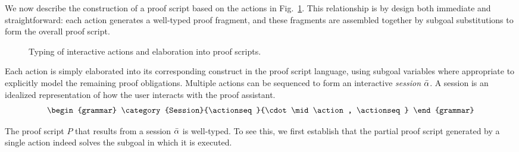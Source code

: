 We now describe the construction of a proof script based on the
actions in Fig.~\ref{fig:interactive}. This relationship is by
design both immediate and straightforward: each action generates a well-typed
proof fragment, and these fragments are assembled together by subgoal
substitutions to form the overall proof script.

\begin{figure}
  \caption{%
    Typing of interactive actions and elaboration into proof scripts.
  }%
  \label{fig:interactive}%
\end{figure}

Each action is simply elaborated into its corresponding construct in the proof
script language, using subgoal variables where appropriate to explicitly model
the remaining proof obligations.
%
%
%
%
%
Multiple actions can be sequenced to form an interactive
\emph{session} $\bar{\alpha}$. A session is an idealized representation of how the
user interacts with the proof assistant.
%
\[
  \begin{grammar}
    \category{Session}{\actionseq}{\cdot \mid \action, \actionseq}
  \end{grammar}
\]
%

The proof script $P$ that results from a session $\bar{\alpha}$ is well-typed.
To see this, we first establish that the partial proof script generated by a
single action indeed solves the subgoal in which it is executed.

